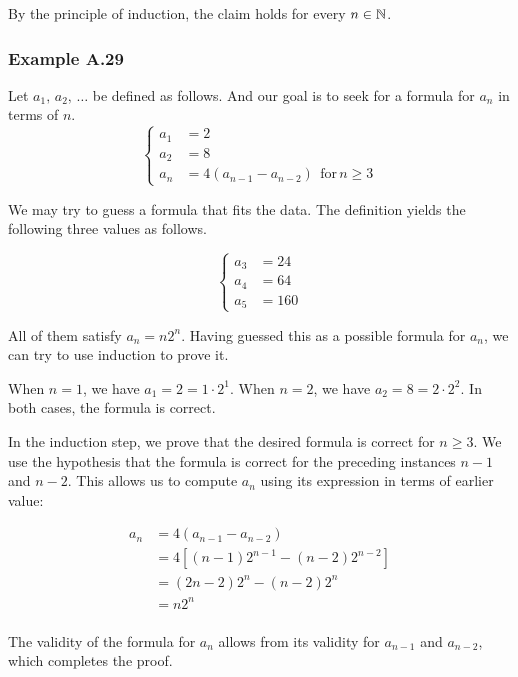\documentclass[../src/handouts/main.tex]{subfiles}
\begin{document}
By the principle of induction, the claim holds for every $n \in \mathbb{N}$.

\subsubsection{Example A.29}

Let $a_1,\, a_2,\, \ldots$ be defined as follows. And our goal is to seek for a formula for $a_n$ in terms of $n$.
$$
  \begin{cases}
    a_1 & = 2                                                   \\
    a_2 & = 8                                                   \\
    a_n & = 4 (a_{n - 1} - a_{n - 2}) \ \ \text{for}\, n \geq 3
  \end{cases}
$$

We may try to guess a formula that fits the data.
The definition yields the following three values as follows.

$$
  \begin{cases}
    a_3 & = 24  \\
    a_4 & = 64  \\
    a_5 & = 160
  \end{cases}
$$

All of them satisfy $a_n = n 2^n$.
Having guessed this as a possible formula for $a_n$, we can try to use induction to prove it.

When $n = 1$, we have $a_1 = 2 = 1 \cdot 2^1$.
When $n = 2$, we have $a_2 = 8 = 2 \cdot 2^2$.
In both cases, the formula is correct.

In the induction step, we prove that the desired formula is correct for $n \geq 3$.
We use the hypothesis that the formula is correct for the preceding instances $n - 1$ and $n - 2$.
This allows us to compute $a_n$ using its expression in terms of earlier value:

$$
  \begin{aligned}
    a_n & = 4 (a_{n - 1} - a_{n - 2})                             \\
        & = 4 \left[ (n - 1) 2^{n - 1} - (n - 2) 2^{n -2} \right] \\
        & = (2 n - 2) 2^n - (n - 2) 2^n                           \\
        & = n 2^n                                                 \\
  \end{aligned}
$$

The validity of the formula for $a_n$ allows from its validity for $a_{n -1}$ and $a_{n - 2}$, which completes the proof.
\end{document}
